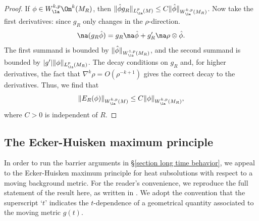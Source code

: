 \documentclass[hidelinks, 12pt, oneside, reqno]{amsart}
\begin{document}
\begin{proof}
    If $\phi \in W^{k,p}_\la \Om^k(M_R)$, then $\|\hat \phi g_R\|_{L^p_\la(M)} \le C \|\hat \phi\|_{W^{k,p}_\la (M_R)}$. Now take the first derivatives: since $g_R$ only changes in the $\rho$-direction. 
    \[
    \na (g_R \hat \phi) = g_R \na \hat \phi + g_R' \na \rho \otimes \hat \phi. 
    \]
    The first summand is bounded by $\|\hat \phi \|_{W^{1,p}_{\la}(M_R)}$, and the second summand is bounded by $|g'|\| \phi \|_{L^p_{\la}(M_R)}$. The decay conditions on $g_R$ and, for higher derivatives, the fact that $\nabla^k \rho = O(\rho^{-k+1})$ gives the correct decay to the derivatives. Thus, we find that 
    \[
    \|E_R(\phi)\|_{W^{k,p}_{\la}(M)} \le C\|\phi\|_{W^{k,p}_{\la}(M_R)},
    \]
    where $C>0$ is independent of $R$.
\end{proof}

\subsection{The Ecker-Huisken maximum principle}

In order to run the barrier arguments in \S \ref{section long time behavior}, we appeal to the Ecker-Huisken maximum principle for heat subsolutions with respect to a moving background metric. For the reader's convenience, we reproduce the full statement of the result here, as written in \cite[Theorem 5]{DaiMa}. We adopt the convention that the superscript `$t$' indicates the $t$-dependence of a geometrical quantity associated to the moving metric $g(t)$.
\end{document}
